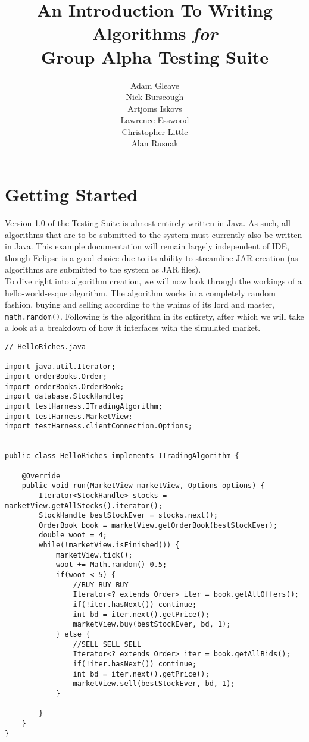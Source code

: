 \documentclass[11pt]{article}
\title{\textbf{An Introduction To Writing Algorithms \emph{for}\\Group Alpha Testing Suite}}
\author{Adam Gleave\\
		Nick Burscough\\
		Artjoms Iskovs\\
		Lawrence Esswood\\
		Christopher Little\\
		Alan Rusnak}
\date{}
\begin{document}
\maketitle

\section{Getting Started}

Version 1.0 of the Testing Suite is almost entirely written in Java. As such, all algorithms that are to be submitted to the system must currently also be written in Java. This example documentation will remain largely independent of IDE, though Eclipse is a good choice due to its ability to streamline JAR creation (as algorithms are submitted to the system as JAR files).\\
To dive right into algorithm creation, we will now look through the workings of a hello-world-esque algorithm. The algorithm works in a completely random fashion, buying and selling according to the whims of its lord and master, \texttt{math.random()}. Following is the algorithm in its entirety, after which we will take a look at a breakdown of how it interfaces with the simulated market.\newpage

\begin{lstlisting}
// HelloRiches.java

import java.util.Iterator;
import orderBooks.Order;
import orderBooks.OrderBook;
import database.StockHandle;
import testHarness.ITradingAlgorithm;
import testHarness.MarketView;
import testHarness.clientConnection.Options;


public class HelloRiches implements ITradingAlgorithm {

	@Override
	public void run(MarketView marketView, Options options) {
		Iterator<StockHandle> stocks = marketView.getAllStocks().iterator();
		StockHandle bestStockEver = stocks.next();
		OrderBook book = marketView.getOrderBook(bestStockEver);
		double woot = 4;
		while(!marketView.isFinished()) {
			marketView.tick();
			woot += Math.random()-0.5;
			if(woot < 5) {
				//BUY BUY BUY
				Iterator<? extends Order> iter = book.getAllOffers();
				if(!iter.hasNext()) continue;
				int bd = iter.next().getPrice();
				marketView.buy(bestStockEver, bd, 1);
			} else {
				//SELL SELL SELL
				Iterator<? extends Order> iter = book.getAllBids();
				if(!iter.hasNext()) continue;
				int bd = iter.next().getPrice();
				marketView.sell(bestStockEver, bd, 1);
			}
			
		}
	}
}

\end{lstlisting}
\end{document}
